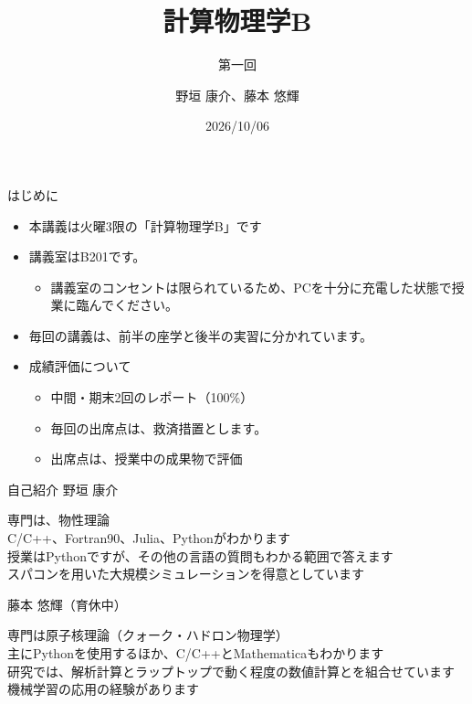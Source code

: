 \documentclass[12pt,aspectratio=43]{beamer}
\title{計算物理学B}
\subtitle{第一回}
\author{野垣 康介、藤本 悠輝}
\date{2026/10/06}
\begin{document}
\begin{frame}[t,noframenumbering]
  \titlepage
\end{frame}

\begin{frame}{はじめに}
  \begin{itemize}
    \setlength{\itemsep}{3mm}
    \item 本講義は火曜3限の「計算物理学B」です
    \item 講義室はB201です。
      \begin{itemize}
        \item 講義室のコンセントは限られているため、PCを十分に充電した状態で授業に臨んでください。
      \end{itemize}
    \item 毎回の講義は、前半の座学と後半の実習に分かれています。
    \item 成績評価について
      \begin{itemize}
        \setlength{\itemsep}{1mm}
        \item 中間・期末2回のレポート（100\%）
        \item 毎回の出席点は、救済措置とします。
        \item 出席点は、授業中の成果物で評価
      \end{itemize}
  \end{itemize}
\end{frame}

\begin{frame}{自己紹介}
  \begingroup\fontsize{14}{17}\selectfont 野垣 康介\par\endgroup
  \par\begingroup\small\leftskip=5mm\relax\parskip=0pt
    専門は、物性理論\\
    C/C++、Fortran90、Julia、Pythonがわかります\\
    授業はPythonですが、その他の言語の質問もわかる範囲で答えます\\
    スパコンを用いた大規模シミュレーションを得意としています
  \par\endgroup
  \begingroup\fontsize{14}{17}\selectfont 藤本 悠輝（育休中）\par\endgroup
  \par\begingroup\small\leftskip=5mm\relax\parskip=0pt
    専門は原子核理論（クォーク・ハドロン物理学）\\
    主にPythonを使用するほか、C/C++とMathematicaもわかります\\
    研究では、解析計算とラップトップで動く程度の数値計算とを組合せています\\
    機械学習の応用の経験があります
  \par\endgroup
\end{frame}
\end{document}
